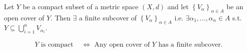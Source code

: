 \begin{theorem}
    Let \(Y\) be a compact subset of a metric space \((X, d)\) and let \(\left\{ V_\alpha  \right\}_{\alpha \in A} \) be an open cover of \(Y\). Then \(\exists \) a finite subcover of \(\left\{ V_\alpha  \right\}_{\alpha \in A} \) i.e. \(\exists \alpha _1, \dots ,\alpha _n \in A\) s.t. \(Y \subseteq \bigcup_{i=1}^{n} V_{\alpha _i}. \)        
\end{theorem}

\begin{remark}
    \begin{align*}
        Y \text{ is compact } &\iff \text{ Any open cover of } Y \text{ has a finite subcover.}
    \end{align*}
\end{remark}
